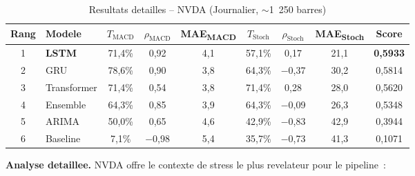 \documentclass[12pt, a4paper]{article}
\begin{document}
\begin{table}[H]
\centering
\caption{Resultats detailles -- NVDA (Journalier, $\sim$1~250 barres)}
\begin{tabular}{clccccccc}
\toprule
\textbf{Rang} & \textbf{Modele} & $T_\text{MACD}$ & $\rho_\text{MACD}$ & \textbf{MAE\textsubscript{MACD}} & $T_\text{Stoch}$ & $\rho_\text{Stoch}$ & \textbf{MAE\textsubscript{Stoch}} & \textbf{Score} \\
\midrule
\rowcolor{vertclair}
1 & \textbf{LSTM} & 71,4\% & 0,92 & 4,1 & 57,1\% & 0,17 & 21,1 & \textbf{0,5933} \\
2 & GRU           & 78,6\% & 0,90 & 3,8 & 64,3\% & $-$0,37 & 30,2 & 0,5814 \\
3 & Transformer   & 71,4\% & 0,54 & 3,8 & 71,4\% & 0,28 & 28,0 & 0,5620 \\
4 & Ensemble      & 64,3\% & 0,85 & 3,9 & 64,3\% & $-$0,09 & 26,3 & 0,5348 \\
5 & ARIMA         & 50,0\% & 0,65 & 4,6 & 42,9\% & $-$0,83 & 42,9 & 0,3944 \\
\rowcolor{rougeclair}
6 & Baseline      &  7,1\% & $-$0,98 & 5,4 & 35,7\% & $-$0,73 & 41,3 & 0,1071 \\
\bottomrule
\end{tabular}
\end{table}

\textbf{Analyse detaillee.}
NVDA offre le contexte de stress le plus revelateur pour le pipeline~:
\end{document}
